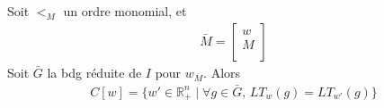         \begin{prop}
            Soit $<_M$ un ordre monomial, et
            \begin{align*}
                \bar M =
                \begin{bmatrix}
                    w \\
                    M \\
                \end{bmatrix}
            \end{align*}
            Soit $\bar G$ la bdg réduite de $I$ pour $w_{\bar M}$. Alors
            \begin{align*}
                C[w] = \{w' \in \mathbb{R}_+^n \mid \forall g \in \bar G,\, LT_w(g) = LT_{w'}(g) \}
            \end{align*}
        \end{prop}
